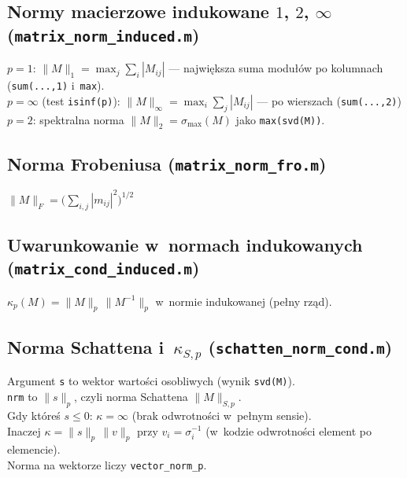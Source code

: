 \documentclass[polish]{template/projectreport}
\begin{document}
\subsection{Normy macierzowe indukowane $1$, $2$, $\infty$ (\texttt{matrix\_norm\_induced.m})}


\noindent $p=1$: $\|M\|_1=\max_j\sum_i|M_{ij}|$ --- największa suma modułów po kolumnach (\texttt{sum(...,1)} i~\texttt{max}).\\
$p=\infty$ (test \texttt{isinf(p)}): $\|M\|_\infty=\max_i\sum_j|M_{ij}|$ --- po wierszach (\texttt{sum(...,2)})\\
$p=2$: spektralna norma $\|M\|_2=\sigma_{\max}(M)$ jako \texttt{max(svd(M))}.\\

\subsection{Norma Frobeniusa (\texttt{matrix\_norm\_fro.m})}


\noindent $\|M\|_F=\bigl(\sum_{i,j}|m_{ij}|^2\bigr)^{1/2}$

\subsection{Uwarunkowanie w~normach indukowanych (\texttt{matrix\_cond\_induced.m})}


\noindent $\kappa_p(M)=\|M\|_p\,\|M^{-1}\|_p$ w~normie indukowanej (pełny rząd).\\

\subsection{Norma Schattena i~$\kappa_{S,p}$ (\texttt{schatten\_norm\_cond.m})}


\noindent Argument \texttt{s} to wektor wartości osobliwych (wynik \texttt{svd(M)}).\\
\texttt{nrm} to $\|s\|_p$, czyli norma Schattena $\|M\|_{S,p}$.\\
Gdy któreś $s\le 0$: $\kappa=\infty$ (brak odwrotności w~pełnym sensie).\\
Inaczej $\kappa=\|s\|_p\,\|v\|_p$ przy $v_i=\sigma_i^{-1}$ (w~kodzie odwrotności element po elemencie).\\
Norma na wektorze liczy \texttt{vector\_norm\_p}.
\end{document}
